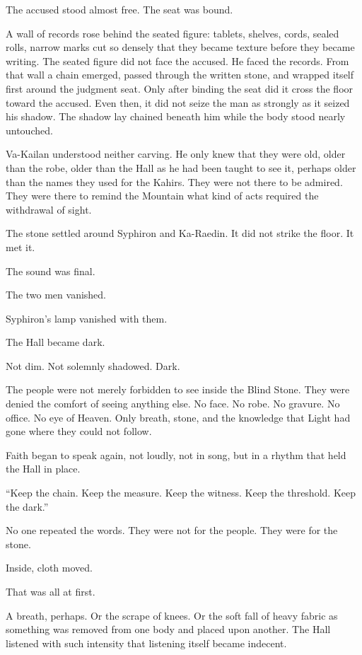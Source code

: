 The accused stood almost free.
The seat was bound.\par
A wall of records rose behind the seated figure: tablets, shelves, cords, sealed rolls, narrow marks cut so densely that they became texture before they became writing.
The seated figure did not face the accused.
He faced the records.
From that wall a chain emerged, passed through the written stone, and wrapped itself first around the judgment seat.
Only after binding the seat did it cross the floor toward the accused.
Even then, it did not seize the man as strongly as it seized his shadow.
The shadow lay chained beneath him while the body stood nearly untouched.\par
Va-Kailan understood neither carving.
He only knew that they were old, older than the robe, older than the Hall as he had been taught to see it, perhaps older than the names they used for the Kahirs.
They were not there to be admired.
They were there to remind the Mountain what kind of acts required the withdrawal of sight.\par
The stone settled around Syphiron and Ka-Raedin.
It did not strike the floor.
It met it.\par
The sound was final.\par
The two men vanished.\par
Syphiron’s lamp vanished with them.\par
The Hall became dark.\par
Not dim.
Not solemnly shadowed.
Dark.\par
The people were not merely forbidden to see inside the Blind Stone.
They were denied the comfort of seeing anything else.
No face.
No robe.
No gravure.
No office.
No eye of Heaven.
Only breath, stone, and the knowledge that Light had gone where they could not follow.\par
Faith began to speak again, not loudly, not in song, but in a rhythm that held the Hall in place.\par
“Keep the chain.
Keep the measure.
Keep the witness.
Keep the threshold.
Keep the dark.”\par
No one repeated the words.
They were not for the people.
They were for the stone.\par
Inside, cloth moved.\par
That was all at first.\par
A breath, perhaps.
Or the scrape of knees.
Or the soft fall of heavy fabric as something was removed from one body and placed upon another.
The Hall listened with such intensity that listening itself became indecent.\par
